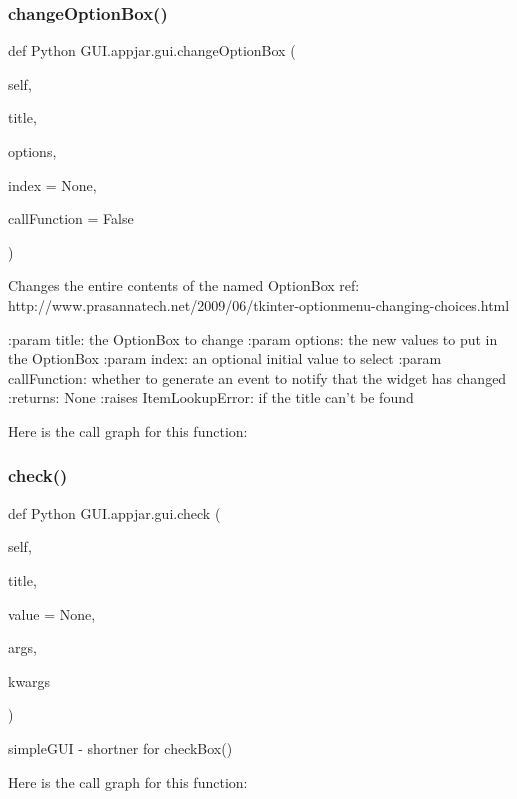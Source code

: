 \subsubsection{\texorpdfstring{change\+Option\+Box()}{changeOptionBox()}}
{\footnotesize\ttfamily def Python G\+U\+I.\+appjar.\+gui.\+change\+Option\+Box (\begin{DoxyParamCaption}\item[{}]{self,  }\item[{}]{title,  }\item[{}]{options,  }\item[{}]{index = {\ttfamily None},  }\item[{}]{call\+Function = {\ttfamily False} }\end{DoxyParamCaption})}

\begin{DoxyVerb}Changes the entire contents of the named OptionBox
ref: http://www.prasannatech.net/2009/06/tkinter-optionmenu-changing-choices.html

:param title: the OptionBox to change
:param options: the new values to put in the OptionBox
:param index: an optional initial value to select
:param callFunction: whether to generate an event to notify that the widget has changed
:returns: None
:raises ItemLookupError: if the title can't be found
\end{DoxyVerb}
 Here is the call graph for this function\+:
\mbox{\label{class_python_01_g_u_i_1_1appjar_1_1gui_a43194199f09702458bf7a01b1fb6585d}} 
\subsubsection{\texorpdfstring{check()}{check()}}
{\footnotesize\ttfamily def Python G\+U\+I.\+appjar.\+gui.\+check (\begin{DoxyParamCaption}\item[{}]{self,  }\item[{}]{title,  }\item[{}]{value = {\ttfamily None},  }\item[{}]{args,  }\item[{}]{kwargs }\end{DoxyParamCaption})}

\begin{DoxyVerb}simpleGUI - shortner for checkBox() \end{DoxyVerb}
 Here is the call graph for this function\+:
\mbox{\label{class_python_01_g_u_i_1_1appjar_1_1gui_a6c76a3964eb53768a4c095ee46996b01}} 
